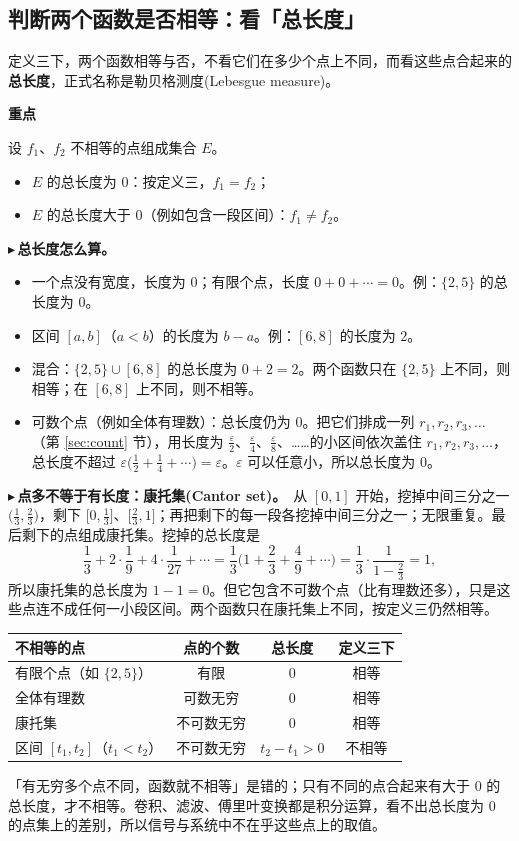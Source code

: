 \documentclass[UTF8,a4paper,11pt]{ctexart}
\newenvironment{remember}{\begin{rememberbox}\textbf{重点}\par\smallskip}{\end{rememberbox}}
\newcounter{ex}[section]
\newcommand{\point}[1]{\par\addvspace{1ex}\noindent\textcolor{ptteal}{$\blacktriangleright$\,\textbf{#1}}\ }
\begin{document}
\subsection{判断两个函数是否相等：看「总长度」}\label{sub:measure}
定义三下，两个函数相等与否，不看它们在多少个点上不同，而看这些点合起来的\textbf{总长度}，正式名称是勒贝格测度(Lebesgue measure)。

\begin{remember}
设 $f_1$、$f_2$ 不相等的点组成集合 $E$。
\begin{itemize}[nosep]
\item $E$ 的总长度为 $0$：按定义三，$f_1=f_2$；
\item $E$ 的总长度大于 $0$（例如包含一段区间）：$f_1\ne f_2$。
\end{itemize}
\end{remember}

\point{总长度怎么算。}
\begin{itemize}[nosep]
\item 一个点没有宽度，长度为 $0$；有限个点，长度 $0+0+\cdots=0$。例：$\{2,5\}$ 的总长度为 $0$。
\item 区间 $[a,b]$（$a<b$）的长度为 $b-a$。例：$[6,8]$ 的长度为 $2$。
\item 混合：$\{2,5\}\cup[6,8]$ 的总长度为 $0+2=2$。两个函数只在 $\{2,5\}$ 上不同，则相等；在 $[6,8]$ 上不同，则不相等。
\item 可数个点（例如全体有理数）：总长度仍为 $0$。把它们排成一列 $r_1,r_2,r_3,\dots$（第 \ref{sec:count} 节），用长度为 $\frac{\varepsilon}{2}$、$\frac{\varepsilon}{4}$、$\frac{\varepsilon}{8}$、……的小区间依次盖住 $r_1,r_2,r_3,\dots$，总长度不超过 $\varepsilon\big(\frac12+\frac14+\cdots\big)=\varepsilon$。$\varepsilon$ 可以任意小，所以总长度为 $0$。
\end{itemize}

\point{点多不等于有长度：康托集(Cantor set)。}从 $[0,1]$ 开始，挖掉中间三分之一 $\big(\frac13,\frac23\big)$，剩下 $\big[0,\frac13\big]$、$\big[\frac23,1\big]$；再把剩下的每一段各挖掉中间三分之一；无限重复。最后剩下的点组成康托集。挖掉的总长度是
\[
\frac13+2\cdot\frac19+4\cdot\frac1{27}+\cdots=\frac13\Big(1+\frac23+\frac49+\cdots\Big)=\frac13\cdot\frac{1}{1-\frac23}=1,
\]
所以康托集的总长度为 $1-1=0$。但它包含不可数个点（比有理数还多），只是这些点连不成任何一小段区间。两个函数只在康托集上不同，按定义三仍然相等。

\begin{center}
\begin{tabular}{lccc}
\toprule
不相等的点 & 点的个数 & 总长度 & 定义三下\\
\midrule
有限个点（如 $\{2,5\}$） & 有限 & $0$ & 相等\\
全体有理数 & 可数无穷 & $0$ & 相等\\
康托集 & 不可数无穷 & $0$ & 相等\\
区间 $[t_1,t_2]$（$t_1<t_2$） & 不可数无穷 & $t_2-t_1>0$ & 不相等\\
\bottomrule
\end{tabular}
\end{center}
「有无穷多个点不同，函数就不相等」是错的；只有不同的点合起来有大于 $0$ 的总长度，才不相等。卷积、滤波、傅里叶变换都是积分运算，看不出总长度为 $0$ 的点集上的差别，所以信号与系统中不在乎这些点上的取值。
\end{document}

